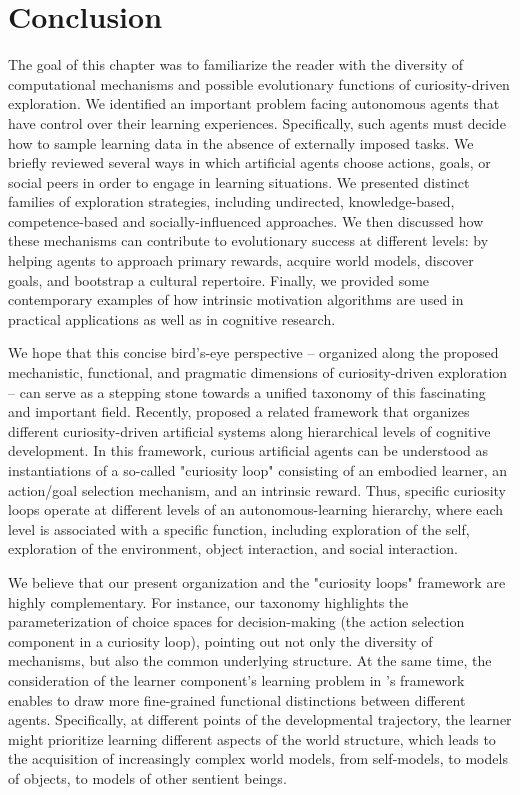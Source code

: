 \section{Conclusion}\label{CH3_S_conclusion}
The goal of this chapter was to familiarize the reader with the diversity of computational mechanisms and possible evolutionary functions of curiosity-driven exploration. We identified an important problem facing autonomous agents that have control over their learning experiences. Specifically, such agents must decide how to sample learning data in the absence of externally imposed tasks. We briefly reviewed several ways in which artificial agents choose actions, goals, or social peers in order to engage in learning situations. We presented distinct families of exploration strategies, including undirected, knowledge-based, competence-based and socially-influenced approaches. We then discussed how these mechanisms can contribute to evolutionary success at different levels: by helping agents to approach primary rewards, acquire world models, discover goals, and bootstrap a cultural repertoire. Finally, we provided some contemporary examples of how intrinsic motivation algorithms are used in practical applications as well as in cognitive research.

We hope that this concise bird’s-eye perspective -- organized along the proposed mechanistic, functional, and pragmatic dimensions of curiosity-driven exploration -- can serve as a stepping stone towards a unified taxonomy of this fascinating and important field. Recently, \citeauthor{gordon_infant-inspired_2020} \citeyearpar{gordon_infant-inspired_2020} proposed a related framework that organizes different curiosity-driven artificial systems along hierarchical levels of cognitive development. In this framework, curious artificial agents can be understood as instantiations of a so-called "curiosity loop" \cite{gordon_hierarchical_2012} consisting of an embodied learner, an action/goal selection mechanism, and an intrinsic reward. Thus, specific curiosity loops operate at different levels of an autonomous-learning hierarchy, where each level is associated with a specific function, including exploration of the self, exploration of the environment, object interaction, and social interaction.

We believe that our present organization and the "curiosity loops" framework are highly complementary. For instance, our taxonomy highlights the parameterization of choice spaces for decision-making (the action selection component in a curiosity loop), pointing out not only the diversity of mechanisms, but also the common underlying structure. At the same time, the consideration of the learner component's learning problem in \citeauthor{gordon_infant-inspired_2020}'s \citeyearpar{gordon_infant-inspired_2020} framework enables to draw more fine-grained functional distinctions between different agents. Specifically, at different points of the developmental trajectory, the learner might prioritize learning different aspects of the world structure, which leads to the acquisition of increasingly complex world models, from self-models, to models of objects, to models of other sentient beings.